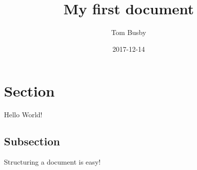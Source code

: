 \documentclass{article}
\title{My first document}
\date{2017-12-14}
\author{Tom Busby}
\begin{document}
\maketitle
{}
\newpage
{}

\section{Section}

Hello World!

\subsection{Subsection}

Structuring a document is easy!
\end{document}

